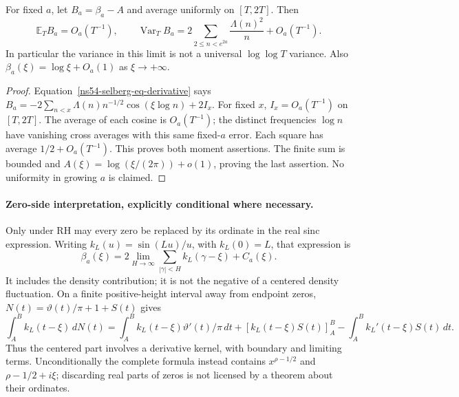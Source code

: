\begin{proposition}
\label{ns54-selberg-prop-fixed}
For fixed $a$, let $B_a=\beta_a-A$ and average uniformly on $[T,2T]$.
Then
\begin{equation}\label{ns54-selberg-eq-fixed}
 \mathbb E_T B_a=O_a(T^{-1}),\qquad
 \operatorname{Var}_T B_a
   =2\sum_{2\le n<e^{2a}}\frac{\Lambda(n)^2}{n}+O_a(T^{-1}).
\end{equation}
In particular the variance in this limit is not a universal
$\log\log T$ variance. Also $\beta_a(\xi)=\log\xi+O_a(1)$ as
$\xi\to+\infty$.
\end{proposition}
\begin{proof}
Equation~\eqref{ns54-selberg-eq-derivative} says
$B_a=-2\sum_{n<x}\Lambda(n)n^{-1/2}\cos(\xi\log n)+2I_x$.
For fixed $x$, $I_x=O_a(T^{-1})$ on $[T,2T]$.
The average of each cosine is $O_a(T^{-1})$; the distinct
frequencies $\log n$ have vanishing cross averages with this same
fixed-$a$ error. Each square has average $1/2+O_a(T^{-1})$.
This proves both moment assertions. The finite sum is bounded and
$A(\xi)=\log(\xi/(2\pi))+o(1)$, proving the last assertion.
No uniformity in growing $a$ is claimed.
\end{proof}

\paragraph{Zero-side interpretation, explicitly conditional where necessary.}
Only under RH may every zero be replaced by its ordinate in the
real sinc expression. Writing $k_L(u)=\sin(Lu)/u$, with $k_L(0)=L$,
that expression is
\[
 \beta_a(\xi)=2\lim_{H\to\infty}
              \sum_{|\gamma|<H}k_L(\gamma-\xi)+C_a(\xi).
\]
It includes the density contribution; it is not the negative of a
centered density fluctuation. On a finite positive-height interval
away from endpoint zeros, $N(t)=\vartheta(t)/\pi+1+S(t)$ gives
\[
 \int_A^B k_L(t-\xi)\,dN(t)
 =\int_A^B k_L(t-\xi)\vartheta'(t)/\pi\,dt
  +[k_L(t-\xi)S(t)]_A^B
  -\int_A^B k_L'(t-\xi)S(t)\,dt.
\]
Thus the centered part involves a derivative kernel, with boundary
and limiting terms. Unconditionally the complete formula instead
contains $x^{\rho-1/2}$ and $\rho-1/2+i\xi$; discarding real parts
of zeros is not licensed by a theorem about their ordinates.

